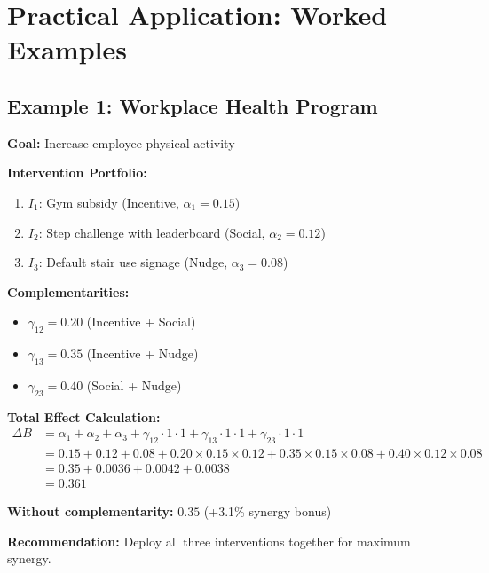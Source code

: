 \section{Practical Application: Worked Examples}
\label{sec:examples}

\subsection{Example 1: Workplace Health Program}

\begin{tcolorbox}[colback=gray!5!white,colframe=gray!75!black,title=\textbf{Case: Corporate Wellness Initiative}]

\textbf{Goal:} Increase employee physical activity

\textbf{Intervention Portfolio:}
\begin{enumerate}[noitemsep]
    \item $I_1$: Gym subsidy (Incentive, $\alpha_1 = 0.15$)
    \item $I_2$: Step challenge with leaderboard (Social, $\alpha_2 = 0.12$)
    \item $I_3$: Default stair use signage (Nudge, $\alpha_3 = 0.08$)
\end{enumerate}

\textbf{Complementarities:}
\begin{itemize}[noitemsep]
    \item $\gamma_{12} = 0.20$ (Incentive + Social)
    \item $\gamma_{13} = 0.35$ (Incentive + Nudge)
    \item $\gamma_{23} = 0.40$ (Social + Nudge)
\end{itemize}

\textbf{Total Effect Calculation:}
\begin{align}
\Delta B &= \alpha_1 + \alpha_2 + \alpha_3 + \gamma_{12} \cdot 1 \cdot 1 + \gamma_{13} \cdot 1 \cdot 1 + \gamma_{23} \cdot 1 \cdot 1 \\
&= 0.15 + 0.12 + 0.08 + 0.20 \times 0.15 \times 0.12 + 0.35 \times 0.15 \times 0.08 + 0.40 \times 0.12 \times 0.08 \\
&= 0.35 + 0.0036 + 0.0042 + 0.0038 \\
&= 0.361
\end{align}

\textbf{Without complementarity:} $0.35$ (+3.1\% synergy bonus)

\textbf{Recommendation:} Deploy all three interventions together for maximum synergy.
\end{tcolorbox}

